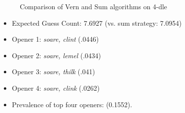 \documentclass[11pt, oneside]{article} 	%
\begin{document}
\begin{figure}[!htb]
 \centering
 \qquad
 \caption{Comparison of Vern and Sum algorithms on 4-dle}%
\end{figure}


\begin{itemize}
\item Expected Guess Count: 7.6927 (vs. sum strategy: 7.0954)
\item Opener 1: \emph{soare, clint} (.0446)
\item Opener 2: \emph{soare, lemel} (.0434)
\item Opener 3: \emph{soare, thilk} (.041)
\item Opener 4: \emph{soare, clink} (.0262)
\item Prevalence of top four openers: (0.1552). 
\end{itemize}
\end{document}
